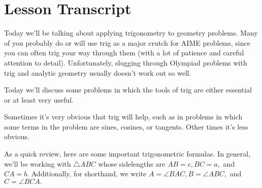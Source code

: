 \section{Lesson Transcript}










Today we'll be talking about applying trigonometry to geometry problems.  Many of you probably do or will use trig as a major crutch for AIME problems, since you can often trig your way through them (with a lot of patience and careful attention to detail).  Unfortunately, slugging through Olympiad problems with trig and analytic geometry usually doesn't work out so well.

Today we'll discuss some problems in which the tools of trig are either essential or at least very useful.

Sometimes it's very obvious that trig will help, such as in problems in which some terms in the problem are sines, cosines, or tangents.  Other times it's less obvious.

As a quick review, here are some important trigonometric formulas. In general, we'll be working with $\triangle ABC$ whose sidelengths are $AB = c, BC = a,$ and $CA = b.$ Additionally, for shorthand, we write $A = \angle BAC, B = \angle ABC,$ and $C = \angle BCA.$

